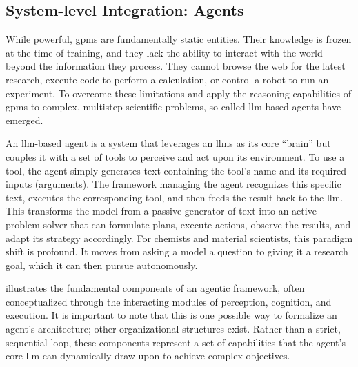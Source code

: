 \subsection{System-level Integration: Agents} \label{sec:agents}

While powerful, \glspl{gpm} are fundamentally static entities. Their knowledge is frozen at the time of training, and they lack the ability to interact with the world beyond the information they process.  They cannot browse the web for the latest research, execute code to perform a calculation, or control a robot to run an experiment. 
To overcome these limitations and apply the reasoning capabilities of \glspl{gpm} to complex, multistep scientific problems, so-called \gls{llm}-based agents have emerged.

An \gls{llm}-based agent is a system that leverages an \glspl{llm} as its core \enquote{brain} but couples it with a set of tools to perceive and act upon its environment. To use a tool, the agent simply generates text containing the tool's name and its required inputs (arguments). The framework managing the agent recognizes this specific text, executes the corresponding tool, and then feeds the result back to the \gls{llm}. This transforms the model from a passive generator of text into an active problem-solver that can formulate plans, execute actions, observe the results, and adapt its strategy accordingly.  For chemists and material scientists, this paradigm shift is profound. It moves from asking a model a question to giving it a research goal, which it can then pursue autonomously.

 illustrates the fundamental components of an agentic framework, often conceptualized through the interacting modules of perception, cognition, and execution. It is important to note that this is one possible way to formalize an agent's architecture; other organizational structures exist. Rather than a strict, sequential loop, these components represent a set of capabilities that the agent's core \gls{llm} can dynamically draw upon to achieve complex objectives.

